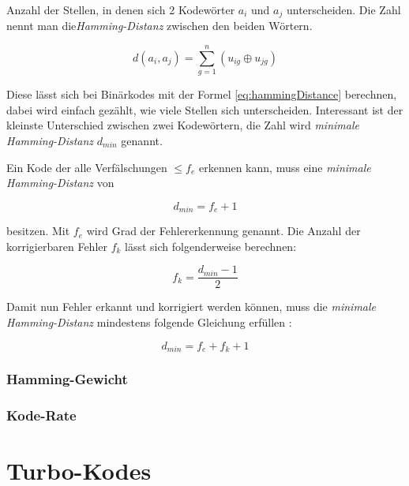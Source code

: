 \begin{t_def}
Anzahl der Stellen, in denen sich 2 Kodewörter $a_i$ und $a_j$ unterscheiden. Die Zahl nennt man die\emph{Hamming-Distanz} zwischen den beiden Wörtern.
\end{t_def} 
 
\begin{equation}
d(a_i,a_j) = \sum^{n}_{g=1} (u_{ig} \oplus u_{jg})
\label{eq:hammingDistance}
\end{equation}

Diese lässt sich bei Binärkodes mit der Formel \ref{eq:hammingDistance} berechnen, dabei wird einfach gezählt, wie viele Stellen sich unterscheiden. Interessant ist der kleinste Unterschied zwischen zwei Kodewörtern, die Zahl wird \emph{minimale Hamming-Distanz} $d_{min}$ genannt.

Ein Kode der alle Verfälschungen $\leq f_e$ erkennen kann, muss eine \emph{minimale Hamming-Distanz} von 

\begin{equation}
d_{min} = f_e + 1
\end{equation}

besitzen. Mit $f_e$ wird Grad der Fehlererkennung genannt. Die Anzahl der korrigierbaren Fehler $f_k$ lässt sich folgenderweise berechnen:

\begin{equation}
f_k = \frac{d_{min}-1}{2}
\end{equation}

Damit nun Fehler erkannt und korrigiert werden können, muss die \emph{minimale Hamming-Distanz} mindestens folgende Gleichung erfüllen \cite[132 f.]{schoenfeld2012informations}:

\begin{equation}
d_{min} = f_e + f_k + 1
\end{equation} 

\subsubsection{Hamming-Gewicht}
\label{sec:hammingWeight}

\subsubsection{Kode-Rate}
\label{sec:codeRate}

\section{Turbo-Kodes}
\label{sec:turboCodes}